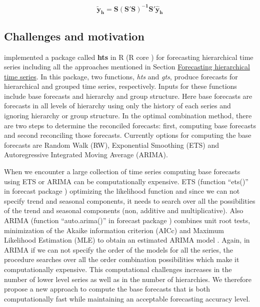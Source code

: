 \documentclass[11pt,a4paper,]{article}
\begin{document}
\begin{equation}\label{eq:reconciledforecasts}
   \mathbf{\tilde{y}_{h}}=\mathbf{S(S'S)^{-1}S'}\mathbf{\hat{y}_h}
\end{equation}

\subsection{Challenges and motivation}\label{challenges-and-motivation}

\textcite{hyndman2015hts} implemented a package called \textbf{hts} in R
(R core \textcite{team2013r}) for forecasting hierarchical time series
including all the approaches mentioned in Section
\protect\hyperlink{forecasting-hierarchical-time-series}{Forecasting
hierarchical time series}. In this package, two functions, \emph{hts}
and \emph{gts}, produce forecasts for hierarchical and grouped time
series, respectively. Inputs for these functions include base forecasts
and hierarchy and group structure. Here base forecasts are forecasts in
all levels of hierarchy using only the history of each series and
ignoring hierarchy or group structure. In the optimal combination
method, there are two steps to determine the reconciled forecasts:
first, computing base forecasts and second reconciling those forecasts.
Currently options for computing the base forecasts are Random Walk (RW),
Exponential Smoothing (ETS) and Autoregressive Integrated Moving Average
(ARIMA).

When we encounter a large collection of time series computing base
forecasts using ETS or ARIMA can be computationally expensive. ETS
(function ``ets()'' in forecast package \autocite{hyndman2007automatic})
optimizing the likelihood function and since we can not specify trend
and seasonal components, it needs to search over all the possibilities
of the trend and seasonal components (non, additive and multiplicative).
Also ARIMA (function ``auto.arima()'' in forecast package
\autocite{hyndman2007automatic}) combines unit root tests, minimization
of the Akaike information criterion (AICc)
\autocite{akaike1998information} and Maximum Likelihood Estimation (MLE)
to obtain an estimated ARIMA model \autocite{hyndman2018forecasting}.
Again, in ARIMA if we can not specify the order of the models for all
the series, the procedure searches over all the order combination
possibilities which make it computationally expensive. This
computational challenges increases in the number of lower level series
as well as in the number of hierarchies. We therefore propose a new
approach to compute the base forecasts that is both computationally fast
while maintaining an acceptable forecasting accuracy level.
\end{document}

